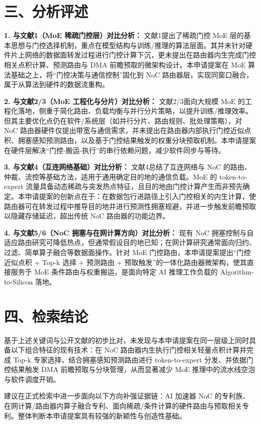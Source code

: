 \documentclass[12pt,a4paper]{article}
\begin{document}
\section*{三、分析评述}

\textbf{1. 与文献1（MoE 稀疏门控层）对比分析：}
文献1提出了稀疏门控 MoE 层的基本思想与门控选择机制，重点在模型结构与训练/推理的算法层面。其并未针对硬件片上网络的数据面转发过程进行门控计算下沉，更未提出在路由器内生完成门控相关点积计算、预测路由与 DMA 前瞻预取的微架构设计。本申请提案在 MoE 算法基础之上，将“门控决策与通信控制”固化到 NoC 路由器层，实现同窗口融合，属于从算法到硬件的数据流重构。

\textbf{2. 与文献2/3（MoE 工程化与分片）对比分析：}
文献2/3面向大规模 MoE 的工程化落地，侧重于简化路由、负载均衡与并行分片策略，以提升训练/推理效率。但其主要优化点仍在软件/系统层（如并行分片、路由规则、批处理策略），对 NoC 路由器硬件仅提出带宽与通信需求，并未提出在路由器内部执行门控近似点积、拥塞感知预测路由，以及基于门控结果触发的权重分块预取机制。本申请提案在硬件层解决“门控-搬运-执行”的串行依赖问题，减少软件同步与等待。

\textbf{3. 与文献4（互连网络基础）对比分析：}
文献4总结了互连网络与 NoC 的路由、仲裁、流控等基础方法，适用于通用确定目的地的通信负载。MoE 的 token-to-expert 流量具备动态稀疏与突发热点特征，且目的地由门控计算产生而非预先确定。本申请提案的创新点在于：在数据包行进路径上引入门控相关的内生计算，使路由器可在转发过程中推导目的地并进行预测性拥塞规避，并进一步触发前瞻预取以隐藏存储延迟，超出传统 NoC 路由器的功能边界。

\textbf{4. 与文献5/6（NoC 拥塞与在网计算方向）对比分析：}
现有 NoC 拥塞控制与自适应路由研究可降低热点，但通常假设目的地已知；在网计算研究通常面向归约、过滤、简单算子融合等数据面操作。针对 MoE 门控路由，本申请提案提出“门控近似点积 + Top-k 选择 + 预测路由 + 预取触发”的一体化路由器微架构，使其直接服务于 MoE 条件路由与权重搬运，是面向特定 AI 推理工作负载的 Algorithm-to-Silicon 落地。

\section*{四、检索结论}

基于上述关键词与公开文献的初步比对，未发现与本申请提案在同一层级上同时具备以下组合特征的现有技术：在 NoC 路由器内生执行门控相关轻量点积计算并完成 Top-k 专家选择、结合拥塞感知预测路由进行 token-to-expert 分发、并依据门控结果触发 DMA 前瞻预取与分块管理，从而显著减少 MoE 推理中的流水线空泡与软件调度开销。

建议在正式检索中进一步面向以下方向补强证据链：AI 加速器 NoC 的专利族、在网计算/路由器内算子融合专利、面向稀疏/条件计算的硬件路由与预取相关专利。整体判断本申请提案具有较强的新颖性与创造性基础。
\end{document}
